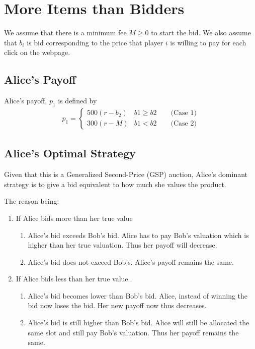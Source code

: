\documentclass[]{article}
\begin{document}
\newpage
\section{More Items than Bidders}

We assume that there is a minimum fee $M \geq 0$ to start the bid. We also assume that $b_i$ is bid corresponding to the price that player $i$ is willing to pay for each click on the webpage.

\subsection{Alice's Payoff}

Alice's payoff, $p_1$ is defined by
\begin{align*}
	p_1 = 
	\begin{cases} 
		500(r - b_2) & b1 \geq b2 \qquad  \text{(Case 1)} \\
		300(r - M) & b1 < b2 \qquad \text{(Case 2)}
	\end{cases}
\end{align*}

\subsection{Alice's Optimal Strategy}

Given that this is a Generalized Second-Price (GSP) auction, Alice's dominant strategy is to give a bid equivalent to how much she values the product.

The reason being:
\begin{enumerate}
	\item If Alice bids more than her true value
	\begin{enumerate}[label=\alph*]
		\item Alice's bid exceeds Bob's bid. Alice has to pay Bob's valuation which is higher than her true valuation. Thus her payoff will decrease.
		\item Alice's bid does not exceed Bob's. Alice's payoff remains the same. 
	\end{enumerate}
	\item If Alice bids less than her true value..
	\begin{enumerate}[label=\alph*]
		\item Alice's bid becomes lower than Bob's bid. Alice, instead of winning the bid now loses the bid. Her new payoff now thus decreases.
		\item Alice's bid is still higher than Bob's bid. Alice will still be allocated the same slot and still pay Bob's valuation. Thus her payoff remains the same.
	\end{enumerate}
\end{enumerate}
\end{document}
